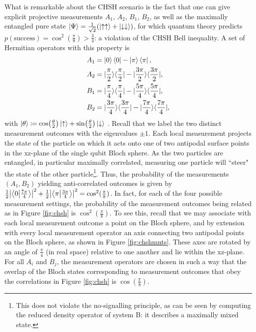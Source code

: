 What is remarkable about the CHSH scenario is the fact that one can give explicit projective measurements $A_{1}$, $A_{2}$, $B_{1}$, $B_{2}$, as well as the maximally entangled pure state $\ket{\Psi} =\frac{1}{\sqrt{2}}(\ket{\uparrow\uparrow} +\ket{\downarrow\downarrow})$, for which quantum theory predicts $p(\text{{success}})=\cos^{2}(\frac{\pi}{8})>\frac{3}{4}$: a violation of the CHSH Bell inequality. A set of Hermitian operators with this property is 
\begin{equation}
\label{eqn:chshmnts}
\begin{split}
A_{1} & =\ket{0}\bra{0}-\ket{\pi}\bra{\pi},\\
A_{2} & =|\frac{\pi}{2}\rangle\langle\frac{\pi}{2}|-|\frac{3\pi}{2}\rangle\langle\frac{3\pi}{2}|,\\
B_{1} & =|\frac{\pi}{4}\rangle\langle\frac{\pi}{4}|-|\frac{5\pi}{4}\rangle\langle\frac{5\pi}{4}|,\\
B_{2} & =|\frac{3\pi}{4}\rangle\langle\frac{3\pi}{4}|-|\frac{7\pi}{4}\rangle\langle\frac{7\pi}{4}|,
\end{split}
\end{equation}
with $\ket{\theta} \coloneqq\cos(\frac{\theta}{2})\ket{\uparrow} +\sin(\frac{\theta}{2})\ket{\downarrow}$ \cite{Colbeck2019}. Recall that we label the two distinct measurement outcomes with the eigenvalues $\pm 1$. Each local measurement projects the state of the particle on which it acts onto one of two antipodal surface points in the xz-plane of the single qubit Bloch sphere. As the two particles are entangled, in particular maximally correlated, measuring one particle will ``steer" the state of the other particle\footnote{This does not violate the no-signalling principle, as can be seen by computing the reduced density operator of system B: it describes a maximally mixed state.}. Thus, the probability of the measurements $(A_1,B_2)$ yielding anti-correlated outcomes is given by $\frac{1}{2}\abs{\bra{0}\ket{\frac{7\pi}{4}}}^2+\frac{1}{2}\abs{\bra{\pi}\ket{\frac{3\pi}{4}}}^2=\cos^2(\frac{\pi}{8})$. In fact, for each of the four possible measurement settings, the probability of the measurement outcomes being related as in Figure \ref{fig:chsh} is $\cos^2(\frac{\pi}{8})$. To see this, recall that we may associate with each local measurement outcome a point on the Bloch sphere, and by extension with every local measurement operator an axis connecting two antipodal points on the Bloch sphere, as shown in Figure \ref{fig:chshmnts}. These axes are rotated by an angle of $\frac{\pi}{4}$ (in real space) relative to one another and lie within the xz-plane. For all $A_i$ and $B_j$, the measurement operators are chosen in such a way that the overlap of the Bloch states corresponding to measurement outcomes that obey the correlations in Figure \ref{fig:chsh} is $\cos(\frac{\pi}{8})$.

